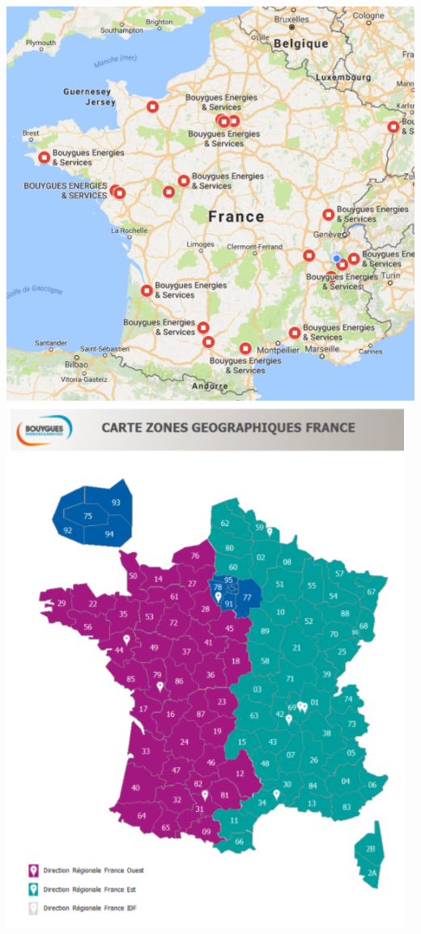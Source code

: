\documentclass[a4paper]{article}
\begin{document}
    \includegraphics[scale=0.5]{img/implantationFrance}
    \includegraphics[scale=0.5]{img/ZGFrance}
\end{document}
